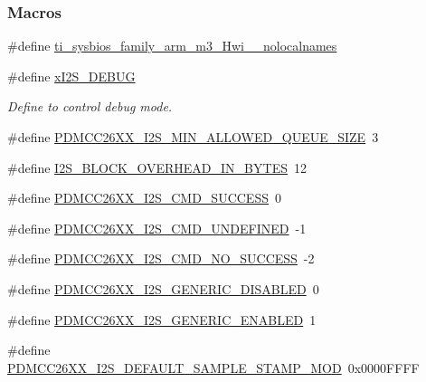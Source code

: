 \subsubsection*{Macros}
\begin{DoxyCompactItemize}
\item 
\#define \hyperlink{_p_d_m_c_c26_x_x__util_8h_aaa17ecf48f5762e2e1bdb0bab8aacf0c}{ti\+\_\+sysbios\+\_\+family\+\_\+arm\+\_\+m3\+\_\+\+Hwi\+\_\+\+\_\+nolocalnames}
\item 
\#define \hyperlink{_p_d_m_c_c26_x_x__util_8h_ac0a29d5ef3ba2f0be6cb4a4541b5c9a5}{x\+I2\+S\+\_\+\+D\+E\+B\+U\+G}
\begin{DoxyCompactList}\small\item\em Define to control debug mode. \end{DoxyCompactList}\item 
\#define \hyperlink{_p_d_m_c_c26_x_x__util_8h_a85f935f09b6a23da28925d08fd6ed5e7}{P\+D\+M\+C\+C26\+X\+X\+\_\+\+I2\+S\+\_\+\+M\+I\+N\+\_\+\+A\+L\+L\+O\+W\+E\+D\+\_\+\+Q\+U\+E\+U\+E\+\_\+\+S\+I\+Z\+E}~3
\item 
\#define \hyperlink{_p_d_m_c_c26_x_x__util_8h_a8b3b29f28fba7618e60409457a14f6f8}{I2\+S\+\_\+\+B\+L\+O\+C\+K\+\_\+\+O\+V\+E\+R\+H\+E\+A\+D\+\_\+\+I\+N\+\_\+\+B\+Y\+T\+E\+S}~12
\item 
\#define \hyperlink{_p_d_m_c_c26_x_x__util_8h_a66928c9a1538dd63beb1fecb3b79817a}{P\+D\+M\+C\+C26\+X\+X\+\_\+\+I2\+S\+\_\+\+C\+M\+D\+\_\+\+S\+U\+C\+C\+E\+S\+S}~0
\item 
\#define \hyperlink{_p_d_m_c_c26_x_x__util_8h_a36e0057e52c089224e60dd745ae8b38a}{P\+D\+M\+C\+C26\+X\+X\+\_\+\+I2\+S\+\_\+\+C\+M\+D\+\_\+\+U\+N\+D\+E\+F\+I\+N\+E\+D}~-\/1
\item 
\#define \hyperlink{_p_d_m_c_c26_x_x__util_8h_a841dd26303cb285b2a8fa0a12ef11410}{P\+D\+M\+C\+C26\+X\+X\+\_\+\+I2\+S\+\_\+\+C\+M\+D\+\_\+\+N\+O\+\_\+\+S\+U\+C\+C\+E\+S\+S}~-\/2
\item 
\#define \hyperlink{_p_d_m_c_c26_x_x__util_8h_abfc231cf2cad7f16b75523024546e912}{P\+D\+M\+C\+C26\+X\+X\+\_\+\+I2\+S\+\_\+\+G\+E\+N\+E\+R\+I\+C\+\_\+\+D\+I\+S\+A\+B\+L\+E\+D}~0
\item 
\#define \hyperlink{_p_d_m_c_c26_x_x__util_8h_a7addf5824e414ed59a40c360b8497fad}{P\+D\+M\+C\+C26\+X\+X\+\_\+\+I2\+S\+\_\+\+G\+E\+N\+E\+R\+I\+C\+\_\+\+E\+N\+A\+B\+L\+E\+D}~1
\item 
\#define \hyperlink{_p_d_m_c_c26_x_x__util_8h_a49eaea1595b37d242a7788a20396aaa3}{P\+D\+M\+C\+C26\+X\+X\+\_\+\+I2\+S\+\_\+\+D\+E\+F\+A\+U\+L\+T\+\_\+\+S\+A\+M\+P\+L\+E\+\_\+\+S\+T\+A\+M\+P\+\_\+\+M\+O\+D}~0x0000\+F\+F\+F\+F

\end{DoxyCompactItemize}
